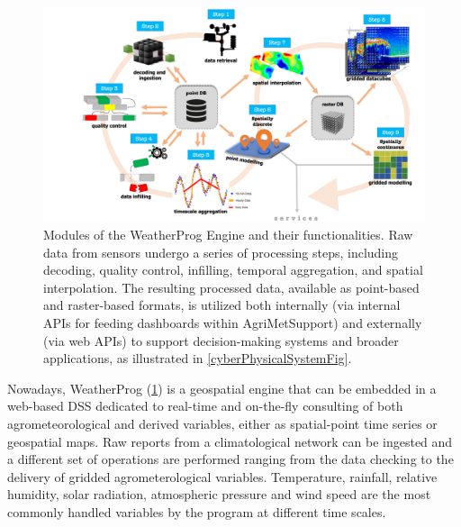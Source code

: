 \documentclass[authoryear,preprint,review,12pt]{elsarticle}
\begin{document}
\begin{figure}[!t] %
	\centering %
	\includegraphics[angle=0,scale=.45,trim=3cm 0cm 0cm 0cm,clip]{Fig04_WeatherProg_modules.png}
	\caption{
            Modules of the WeatherProg Engine and their functionalities. Raw data from sensors undergo a series of processing steps, including decoding, quality control, infilling, temporal aggregation, and spatial interpolation. The resulting processed data, available as point-based and raster-based formats, is utilized both internally (via internal APIs for feeding dashboards within Agri\-Met\-Support) and externally (via web APIs) to support decision-making systems and broader applications, as illustrated in \cref{cyberPhysicalSystemFig}.
 }
	\label{Fig:WeatherProg}
\end{figure}

Nowadays, WeatherProg (\cref{Fig:WeatherProg}) is a geospatial engine that can be embedded in a web-based DSS dedicated to real-time and on-the-fly consulting of both agrometeorological and derived variables, either as spatial-point time series or geospatial maps.
Raw reports from a climatological network can be ingested and a different set of operations are performed ranging from the data checking to the delivery of gridded agrometerological variables.
Temperature, rainfall, relative humidity, solar radiation, atmospheric pressure and wind speed are the most commonly handled variables by the program at different time scales.
\end{document}
